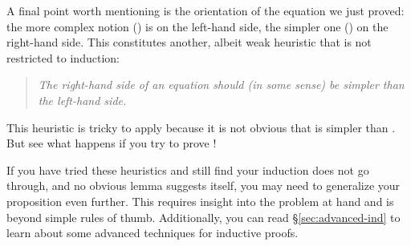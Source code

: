 \begin{isabellebody}
\begin{isamarkuptext}
A final point worth mentioning is the orientation of the equation we just
proved: the more complex notion () is on the left-hand
side, the simpler one () on the right-hand side. This constitutes
another, albeit weak heuristic that is not restricted to induction:
\begin{quote}
  \emph{The right-hand side of an equation should (in some sense) be simpler
    than the left-hand side.}
\end{quote}
This heuristic is tricky to apply because it is not obvious that
 is simpler than . But see what
happens if you try to prove !

If you have tried these heuristics and still find your
induction does not go through, and no obvious lemma suggests itself, you may
need to generalize your proposition even further. This requires insight into
the problem at hand and is beyond simple rules of thumb.  
Additionally, you can read \S\ref{sec:advanced-ind}
to learn about some advanced techniques for inductive proofs.%
%
\end{isamarkuptext}%
\isamarkuptrue%
%
\isadelimtheory
%
\endisadelimtheory
%
\isatagtheory
%
\endisatagtheory
{\isafoldtheory}%
%
\isadelimtheory
%
\endisadelimtheory
\end{isabellebody}%
